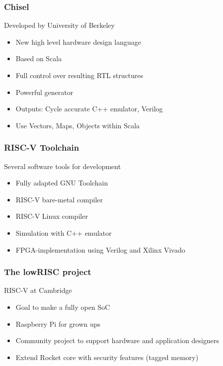 \documentclass{beamer}
\begin{document}
\begin{frame}
	\frametitle{Chisel}
	Developed by University of Berkeley
	\begin{itemize}
		\item New high level hardware design language
		\item Based on Scala
		\item Full control over resulting RTL structures
		\item Powerful generator %
		\item Outputs: Cycle accurate C++ emulator, Verilog
		\item Use Vectors, Maps, Objects within Scala
	\end{itemize}
\end{frame}

\begin{frame}
	\frametitle{RISC-V Toolchain}
	Several software tools for development
	\begin{itemize}
		\item Fully adapted GNU Toolchain
		\item RISC-V bare-metal compiler
		\item RISC-V Linux compiler
		\item Simulation with C++ emulator %
		\item FPGA-implementation using Verilog and Xilinx Vivado
	\end{itemize}
\end{frame}

\begin{frame}
	\frametitle{The lowRISC project}
		RISC-V at Cambridge 
		\begin{itemize}
		\item Goal to make a fully open SoC 
		\item Raspberry Pi for grown ups
		\item Community project to support hardware and application designers  
		\item Extend Rocket core with security features (tagged memory)
	\end{itemize}
\end{frame}
\end{document}
